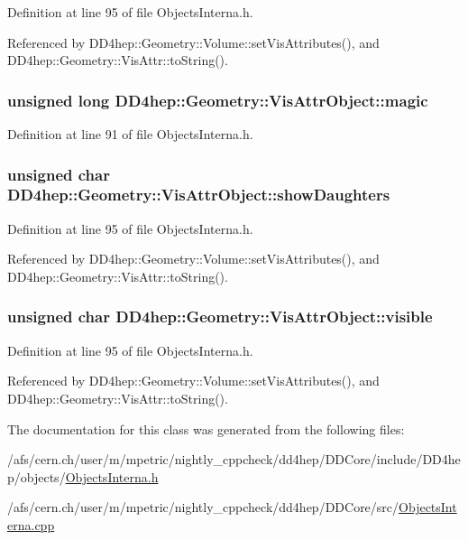 Definition at line 95 of file ObjectsInterna.h.

Referenced by DD4hep::Geometry::Volume::setVisAttributes(), and DD4hep::Geometry::VisAttr::toString().\hypertarget{class_d_d4hep_1_1_geometry_1_1_vis_attr_object_ab8370d8a18bf092a48bde486479bbdff}{
\subsubsection[{magic}]{\setlength{\rightskip}{0pt plus 5cm}unsigned long {\bf DD4hep::Geometry::VisAttrObject::magic}}}
\label{class_d_d4hep_1_1_geometry_1_1_vis_attr_object_ab8370d8a18bf092a48bde486479bbdff}


Definition at line 91 of file ObjectsInterna.h.\hypertarget{class_d_d4hep_1_1_geometry_1_1_vis_attr_object_a7fc2c6d4195f0c8524315272a81436e6}{
\subsubsection[{showDaughters}]{\setlength{\rightskip}{0pt plus 5cm}unsigned char {\bf DD4hep::Geometry::VisAttrObject::showDaughters}}}
\label{class_d_d4hep_1_1_geometry_1_1_vis_attr_object_a7fc2c6d4195f0c8524315272a81436e6}


Definition at line 95 of file ObjectsInterna.h.

Referenced by DD4hep::Geometry::Volume::setVisAttributes(), and DD4hep::Geometry::VisAttr::toString().\hypertarget{class_d_d4hep_1_1_geometry_1_1_vis_attr_object_a316d66f51e43f6601839b271072a4765}{
\subsubsection[{visible}]{\setlength{\rightskip}{0pt plus 5cm}unsigned char {\bf DD4hep::Geometry::VisAttrObject::visible}}}
\label{class_d_d4hep_1_1_geometry_1_1_vis_attr_object_a316d66f51e43f6601839b271072a4765}


Definition at line 95 of file ObjectsInterna.h.

Referenced by DD4hep::Geometry::Volume::setVisAttributes(), and DD4hep::Geometry::VisAttr::toString().

The documentation for this class was generated from the following files:\begin{DoxyCompactItemize}
\item 
/afs/cern.ch/user/m/mpetric/nightly\_\-cppcheck/dd4hep/DDCore/include/DD4hep/objects/\hyperlink{_objects_interna_8h}{ObjectsInterna.h}\item 
/afs/cern.ch/user/m/mpetric/nightly\_\-cppcheck/dd4hep/DDCore/src/\hyperlink{_objects_interna_8cpp}{ObjectsInterna.cpp}\end{DoxyCompactItemize}
